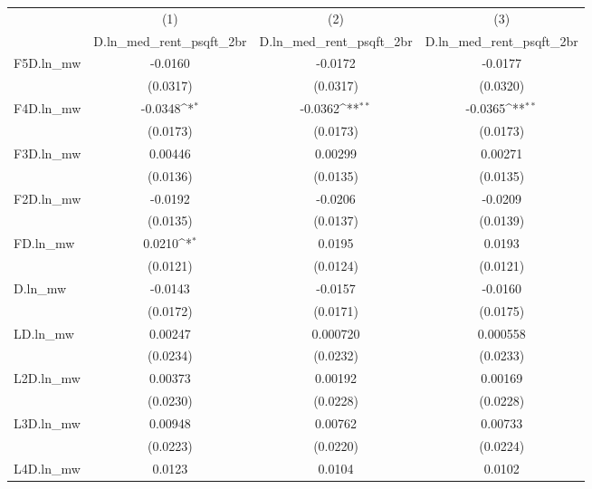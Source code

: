 {
\def\sym#1{\ifmmode^{#1}\else\(^{#1}\)\fi}
\begin{tabular}{l*{3}{c}}
\hline\hline
          &\multicolumn{1}{c}{(1)}&\multicolumn{1}{c}{(2)}&\multicolumn{1}{c}{(3)}\\
          &\multicolumn{1}{c}{D.ln\_med\_rent\_psqft\_2br}&\multicolumn{1}{c}{D.ln\_med\_rent\_psqft\_2br}&\multicolumn{1}{c}{D.ln\_med\_rent\_psqft\_2br}\\
\hline
F5D.ln\_mw &  -0.0160         &  -0.0172         &  -0.0177         \\
          & (0.0317)         & (0.0317)         & (0.0320)         \\
[1em]
F4D.ln\_mw &  -0.0348\sym{*}  &  -0.0362\sym{**} &  -0.0365\sym{**} \\
          & (0.0173)         & (0.0173)         & (0.0173)         \\
[1em]
F3D.ln\_mw &  0.00446         &  0.00299         &  0.00271         \\
          & (0.0136)         & (0.0135)         & (0.0135)         \\
[1em]
F2D.ln\_mw &  -0.0192         &  -0.0206         &  -0.0209         \\
          & (0.0135)         & (0.0137)         & (0.0139)         \\
[1em]
FD.ln\_mw  &   0.0210\sym{*}  &   0.0195         &   0.0193         \\
          & (0.0121)         & (0.0124)         & (0.0121)         \\
[1em]
D.ln\_mw   &  -0.0143         &  -0.0157         &  -0.0160         \\
          & (0.0172)         & (0.0171)         & (0.0175)         \\
[1em]
LD.ln\_mw  &  0.00247         & 0.000720         & 0.000558         \\
          & (0.0234)         & (0.0232)         & (0.0233)         \\
[1em]
L2D.ln\_mw &  0.00373         &  0.00192         &  0.00169         \\
          & (0.0230)         & (0.0228)         & (0.0228)         \\
[1em]
L3D.ln\_mw &  0.00948         &  0.00762         &  0.00733         \\
          & (0.0223)         & (0.0220)         & (0.0224)         \\
[1em]
L4D.ln\_mw &   0.0123         &   0.0104         &   0.0102         \\

\end{tabular}}
